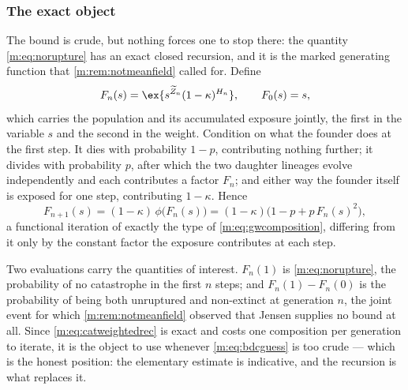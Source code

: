 \subsubsection*{The exact object}

The bound is crude, but nothing forces one to stop there: the quantity
\cref{m:eq:norupture} has an exact closed recursion, and it is the marked
generating function that \cref{m:rem:notmeanfield} called for. Define
\begin{equation}
\label{m:eq:catweightedpgf}
F_n(s) = \ex{s^{\widetilde Z_n}(1-\kappa)^{H_n}},
\qquad F_0(s) = s ,
\end{equation}
which carries the population and its accumulated exposure jointly, the first in the
variable $s$ and the second in the weight. Condition on what the founder does at the
first step. It dies with probability $1-p$, contributing nothing further; it divides
with probability $p$, after which the two daughter lineages evolve independently and
each contributes a factor $F_n$; and either way the founder itself is exposed for one
step, contributing $1-\kappa$. Hence
\begin{equation}
\label{m:eq:catweightedrec}
F_{n+1}(s) = (1-\kappa)\,\phi\bigl(F_n(s)\bigr)
= (1-\kappa)\bigl(1-p+p\,F_n(s)^2\bigr) ,
\end{equation}
a functional iteration of exactly the type of \cref{m:eq:gwcomposition}, differing
from it only by the constant factor the exposure contributes at each step.

Two evaluations carry the quantities of interest. $F_n(1)$ is
\cref{m:eq:norupture}, the probability of no catastrophe in the first $n$ steps; and
$F_n(1)-F_n(0)$ is the probability of being both unruptured and non-extinct at
generation $n$, the joint event for which \cref{m:rem:notmeanfield} observed that
Jensen supplies no bound at all. Since \cref{m:eq:catweightedrec} is exact and costs
one composition per generation to iterate, it is the object to use whenever
\cref{m:eq:bdcguess} is too crude --- which is the honest position: the elementary
estimate is indicative, and the recursion is what replaces it.
